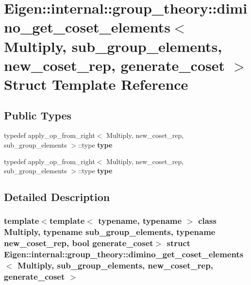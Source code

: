 \hypertarget{struct_eigen_1_1internal_1_1group__theory_1_1dimino__get__coset__elements}{}\section{Eigen\+:\+:internal\+:\+:group\+\_\+theory\+:\+:dimino\+\_\+get\+\_\+coset\+\_\+elements$<$ Multiply, sub\+\_\+group\+\_\+elements, new\+\_\+coset\+\_\+rep, generate\+\_\+coset $>$ Struct Template Reference}
\label{struct_eigen_1_1internal_1_1group__theory_1_1dimino__get__coset__elements}
\subsection*{Public Types}
\begin{DoxyCompactItemize}
\item 
\mbox{\label{struct_eigen_1_1internal_1_1group__theory_1_1dimino__get__coset__elements_a77bde555242e951ffff1760311e7e35f}} 
typedef apply\+\_\+op\+\_\+from\+\_\+right$<$ Multiply, new\+\_\+coset\+\_\+rep, sub\+\_\+group\+\_\+elements $>$\+::type {\bfseries type}
\item 
\mbox{\label{struct_eigen_1_1internal_1_1group__theory_1_1dimino__get__coset__elements_a77bde555242e951ffff1760311e7e35f}} 
typedef apply\+\_\+op\+\_\+from\+\_\+right$<$ Multiply, new\+\_\+coset\+\_\+rep, sub\+\_\+group\+\_\+elements $>$\+::type {\bfseries type}
\end{DoxyCompactItemize}


\subsection{Detailed Description}
\subsubsection*{template$<$template$<$ typename, typename $>$ class Multiply, typename sub\+\_\+group\+\_\+elements, typename new\+\_\+coset\+\_\+rep, bool generate\+\_\+coset$>$\newline
struct Eigen\+::internal\+::group\+\_\+theory\+::dimino\+\_\+get\+\_\+coset\+\_\+elements$<$ Multiply, sub\+\_\+group\+\_\+elements, new\+\_\+coset\+\_\+rep, generate\+\_\+coset $>$}



